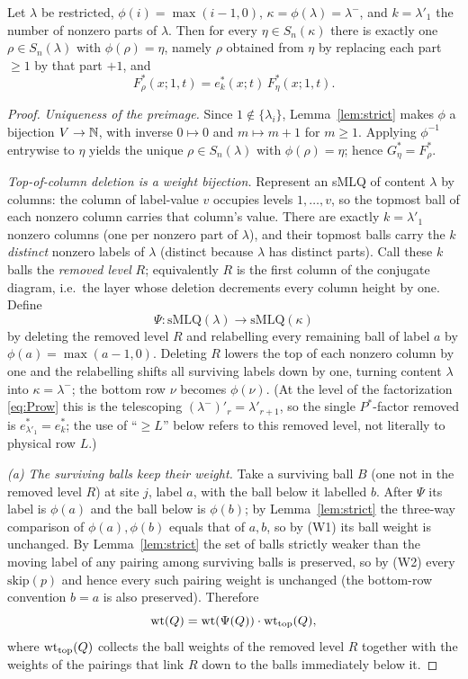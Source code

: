 \begin{qthreelemma}\label{lem:decrement}
Let $\lambda$ be restricted, $\phi(i)=\max(i-1,0)$, $\kappa=\phi(\lambda)=\lambda^-$,
and $k=\lambda'_1$ the number of nonzero parts of $\lambda$. Then for every
$\eta\in S_n(\kappa)$ there is exactly one $\rho\in S_n(\lambda)$ with
$\phi(\rho)=\eta$, namely $\rho$ obtained from $\eta$ by replacing each part $\ge1$
by that part $+1$, and
\[
F^*_\rho(x;1,t)=e^*_k(x;t)\,F^*_\eta(x;1,t).
\]
\end{qthreelemma}

\begin{proof}
\emph{Uniqueness of the preimage.} Since $1\notin\{\lambda_i\}$, Lemma~\ref{lem:strict}
makes $\phi$ a bijection $V\to\mathbb{N}$, with inverse $0\mapsto0$ and $m\mapsto m+1$
for $m\ge1$. Applying $\phi^{-1}$ entrywise to $\eta$ yields the unique
$\rho\in S_n(\lambda)$ with $\phi(\rho)=\eta$; hence $G^*_\eta=F^*_\rho$.

\emph{Top-of-column deletion is a weight bijection.} Represent an sMLQ of content
$\lambda$ by columns: the column of label-value $v$ occupies levels $1,\dots,v$, so
the topmost ball of each nonzero column carries that column's value. There are
exactly $k=\lambda'_1$ nonzero columns (one per nonzero part of $\lambda$), and their
topmost balls carry the $k$ \emph{distinct} nonzero labels of $\lambda$ (distinct
because $\lambda$ has distinct parts). Call these $k$ balls the \emph{removed level}
$R$; equivalently $R$ is the first column of the conjugate diagram, i.e.\ the layer
whose deletion decrements every column height by one. Define
\[
\Psi:\mathrm{sMLQ}(\lambda)\longrightarrow\mathrm{sMLQ}(\kappa)
\]
by deleting the removed level $R$ and relabelling every remaining ball of label $a$
by $\phi(a)=\max(a-1,0)$. Deleting $R$ lowers the top of each nonzero column by one
and the relabelling shifts all surviving labels down by one, turning content
$\lambda$ into $\kappa=\lambda^-$; the bottom row $\nu$ becomes $\phi(\nu)$. (At the
level of the factorization \eqref{eq:Prow} this is the telescoping
$(\lambda^-)'_r=\lambda'_{r+1}$, so the single $P^*$-factor removed is
$e^*_{\lambda'_1}=e^*_k$; the use of ``$\ge L$'' below refers to this removed level,
not literally to physical row $L$.)

\emph{(a) The surviving balls keep their weight.} Take a surviving ball $B$ (one not
in the removed level $R$) at site $j$, label $a$, with the ball below it labelled $b$.
After $\Psi$ its label is $\phi(a)$ and the ball below is $\phi(b)$; by
Lemma~\ref{lem:strict} the three-way comparison of $\phi(a),\phi(b)$ equals that of
$a,b$, so by (W1) its ball weight is unchanged. By Lemma~\ref{lem:strict} the set of
balls strictly weaker than the moving label of any pairing among surviving balls is
preserved, so by (W2) every $\mathrm{skip}(p)$ and hence every such pairing weight is
unchanged (the bottom-row convention $b=a$ is also preserved). Therefore
\[
\operatorname{wt}(Q)=\operatorname{wt}(\Psi(Q))\cdot \operatorname{wt}_{\mathrm{top}}(Q),
\]
where $\operatorname{wt}_{\mathrm{top}}(Q)$ collects the ball weights of the removed level $R$
together with the weights of the pairings that link $R$ down to the balls
immediately below it.


\end{proof}
